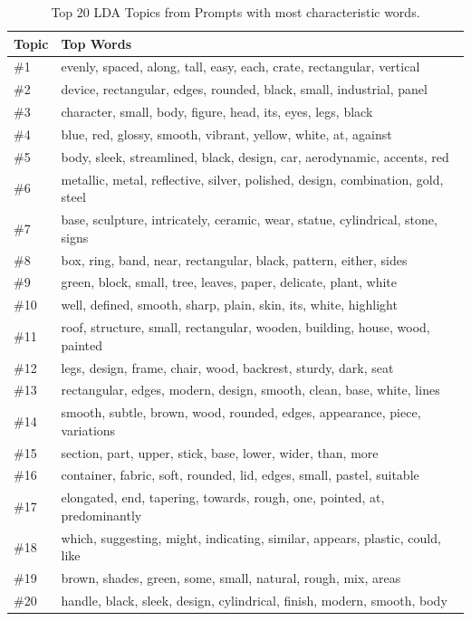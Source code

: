 \begin{table}[h]
  \centering
  \caption{Top 20 LDA Topics from Prompts with most characteristic words.}
  \label{tab:lda-topics}
  \begin{tabular}{ll}
    \toprule
    \textbf{Topic} & \textbf{Top Words} \\
    \midrule
    \#1 & evenly, spaced, along, tall, easy, each, crate, rectangular, vertical \\
    \#2 & device, rectangular, edges, rounded, black, small, industrial, panel \\
    \#3 & character, small, body, figure, head, its, eyes, legs, black \\
    \#4 & blue, red, glossy, smooth, vibrant, yellow, white, at, against \\
    \#5 & body, sleek, streamlined, black, design, car, aerodynamic, accents, red \\
    \#6 & metallic, metal, reflective, silver, polished, design, combination, gold, steel \\
    \#7 & base, sculpture, intricately, ceramic, wear, statue, cylindrical, stone, signs \\
    \#8 & box, ring, band, near, rectangular, black, pattern, either, sides \\
    \#9 & green, block, small, tree, leaves, paper, delicate, plant, white \\
    \#10 & well, defined, smooth, sharp, plain, skin, its, white, highlight \\
    \#11 & roof, structure, small, rectangular, wooden, building, house, wood, painted \\
    \#12 & legs, design, frame, chair, wood, backrest, sturdy, dark, seat \\
    \#13 & rectangular, edges, modern, design, smooth, clean, base, white, lines \\
    \#14 & smooth, subtle, brown, wood, rounded, edges, appearance, piece, variations \\
    \#15 & section, part, upper, stick, base, lower, wider, than, more \\
    \#16 & container, fabric, soft, rounded, lid, edges, small, pastel, suitable \\
    \#17 & elongated, end, tapering, towards, rough, one, pointed, at, predominantly \\
    \#18 & which, suggesting, might, indicating, similar, appears, plastic, could, like \\
    \#19 & brown, shades, green, some, small, natural, rough, mix, areas \\
    \#20 & handle, black, sleek, design, cylindrical, finish, modern, smooth, body \\
    \bottomrule
  \end{tabular}
\end{table}

